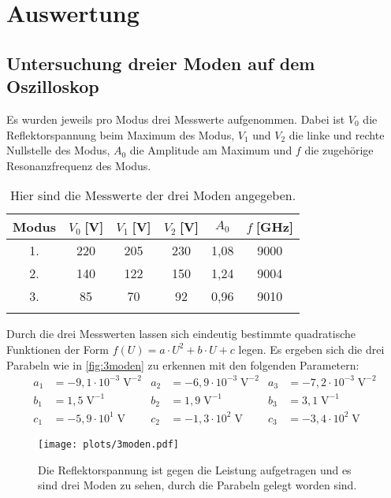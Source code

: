\newpage
\section{Auswertung}
\label{sec:auswertung}
\subsection{Untersuchung dreier Moden auf dem Oszilloskop}
    Es wurden jeweils pro Modus drei Messwerte aufgenommen.
    Dabei ist $V_0$ die Reflektorspannung beim Maximum des Modus, $V_1$ und $V_2$ die linke und rechte Nullstelle des Modus, $A_0$ die Amplitude am Maximum und $f$ die zugehörige Resonanzfrequenz des Modus.
    \begin{table}[h!]
        \centering
        \begin{tabular}{c c c c c c} 
            \toprule
            Modus & $V_0\;$[V] & $V_1\;$[V] & $V_2\;$[V] & $A_0$ & $f\;$[GHz] \\ [0.5ex] 
            \midrule
            1. & 220 & 205 & 230 & 1,08 & 9000 \\ 
            2. & 140 & 122 & 150 & 1,24 & 9004 \\
            3. & 85 & 70 & 92 & 0,96 & 9010 \\
            \bottomrule \\
        \end{tabular}
        \caption{Hier sind die Messwerte der drei Moden angegeben.}
        \label{tab:3moden}
    \end{table}
    Durch die drei Messwerten lassen sich eindeutig bestimmte quadratische Funktionen der Form $f(U) = a \cdot U^2 + b \cdot U + c$ legen.
    Es ergeben sich die drei Parabeln wie in \autoref{fig:3moden} zu erkennen mit den folgenden Parametern:
    \begin{align*}
        a_1 &= -9,1 \cdot 10^{-3} \;\mathrm{V}^{-2} & a_2 &= -6,9 \cdot 10^{-3} \;\mathrm{V}^{-2} & a_3 &= -7,2 \cdot 10^{-3} \;\mathrm{V}^{-2} \\
        b_1 &= 1,5 \;\mathrm{V}^{-1} & b_2 &= 1,9 \;\mathrm{V}^{-1} & b_3 &= 3,1 \;\mathrm{V}^{-1} \\
        c_1 &= -5,9 \cdot 10^{1} \;\mathrm{V} & c_2 &= -1,3 \cdot 10^{2} \;\mathrm{V} & c_3 &= -3,4 \cdot 10^{2} \;\mathrm{V}
    \end{align*}
    \vspace{-15pt}
    \begin{figure}[ht]
        \centering
        \texttt{[image: plots/3moden.pdf]}
        \vspace{-10pt}
        \caption{Die Reflektorspannung ist gegen die Leistung aufgetragen und es sind drei Moden zu sehen, durch die Parabeln gelegt worden sind.}
        \label{fig:3moden}
    \end{figure}

